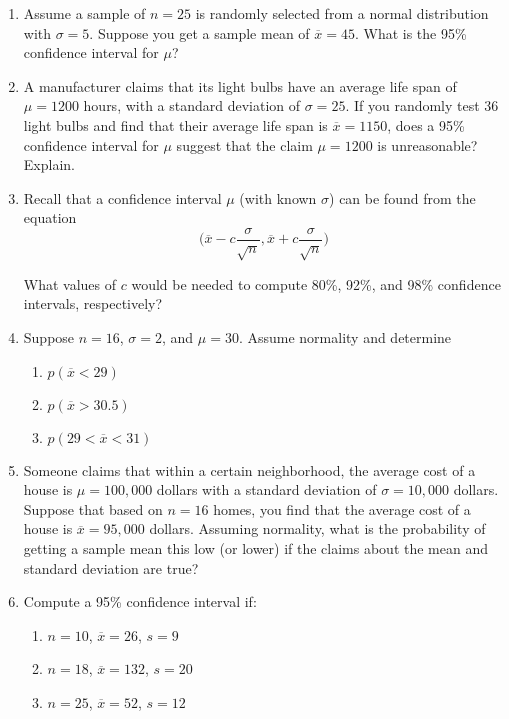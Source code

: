 \documentclass[10pt]{article}
\begin{document}
\begin{enumerate}

\item Assume a sample of $n=25$ is randomly selected from a normal distribution with $\sigma=5$.  Suppose you get a sample mean of $\overline{x}=45$.  What is the 95\% confidence interval for $\mu$?

\item A manufacturer claims that its light bulbs have an average life span of $\mu = 1200$ hours, with a standard deviation of $\sigma=25$.  If you randomly test 36 light bulbs and find that their average life span is $\overline{x}=1150$, does a 95\% confidence interval for $\mu$ suggest that the claim $\mu=1200$ is unreasonable?  Explain.

\item Recall that a confidence interval $\mu$ (with known $\sigma$) can be found from the equation
  \[
    \Biggl(\overline{x}-c\frac{\sigma}{\sqrt{n}}, \overline{x}+c\frac{\sigma}{\sqrt{n}}\Biggr)
  \]

  \noindent
  What values of $c$ would be needed to compute 80\%, 92\%, and 98\% confidence intervals, respectively?

\item Suppose $n=16$, $\sigma=2$, and $\mu=30$.  Assume normality and determine
  \begin{enumerate}
  \item $p(\overline{x}<29)$
  \item $p(\overline{x}>30.5)$
    \item $p(29 < \overline{x} < 31)$
  \end{enumerate}

\item Someone claims that within a certain neighborhood, the average cost of a house is $\mu=100,000$ dollars with a standard deviation of $\sigma=10,000$ dollars.  Suppose that based on $n=16$ homes, you find that the average cost of a house is $\overline{x}=95,000$ dollars.  Assuming normality, what is the probability of getting a sample mean this low (or lower) if the claims about the mean and standard deviation are true?

\item Compute a 95\% confidence interval if:
  \begin{enumerate}
  \item $n=10$, $\overline{x}=26$, $s=9$
  \item $n=18$, $\overline{x}=132$, $s=20$
    \item $n=25$, $\overline{x}=52$, $s=12$
    \end{enumerate}


\end{enumerate}
\end{document}
